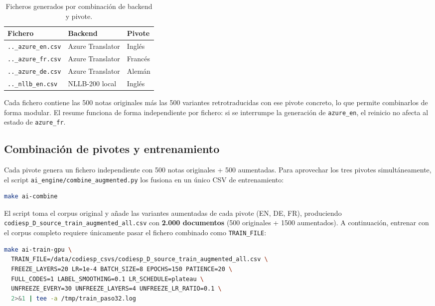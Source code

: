 \begin{table}[h]
\centering
\caption{Ficheros generados por combinación de backend y pivote.}
\label{tab:augment-files}
\begin{tabular}{lll}
\hline
\textbf{Fichero} & \textbf{Backend} & \textbf{Pivote} \\
\hline
\texttt{..\_azure\_en.csv} & Azure Translator & Inglés \\
\texttt{..\_azure\_fr.csv} & Azure Translator & Francés \\
\texttt{..\_azure\_de.csv} & Azure Translator & Alemán \\
\texttt{..\_nllb\_en.csv}  & NLLB-200 local   & Inglés \\
\hline
\end{tabular}
\end{table}

Cada fichero contiene las 500 notas originales más las 500 variantes retrotraducidas con ese pivote concreto, lo que permite combinarlos de forma modular. El resume funciona de forma independiente por fichero: si se interrumpe la generación de \texttt{azure\_en}, el reinicio no afecta al estado de \texttt{azure\_fr}.

\subsection{Combinación de pivotes y entrenamiento}

Cada pivote genera un fichero independiente con 500 notas originales + 500 aumentadas. Para aprovechar los tres pivotes simultáneamente, el script \texttt{ai\_engine/combine\_augmented.py} los fusiona en un único CSV de entrenamiento:

\begin{lstlisting}[language=bash]
make ai-combine
\end{lstlisting}

El script toma el corpus original y añade las variantes aumentadas de cada pivote (EN, DE, FR), produciendo \texttt{codiesp\_D\_source\_train\_augmented\_all.csv} con \textbf{2.000 documentos} (500 originales + 1500 aumentados). A continuación, entrenar con el corpus completo requiere únicamente pasar el fichero combinado como \texttt{TRAIN\_FILE}:

\begin{lstlisting}[language=bash, breaklines=true, breakatwhitespace=false]
make ai-train-gpu \
  TRAIN_FILE=/data/codiesp_csvs/codiesp_D_source_train_augmented_all.csv \
  FREEZE_LAYERS=20 LR=1e-4 BATCH_SIZE=8 EPOCHS=150 PATIENCE=20 \
  FULL_CODES=1 LABEL_SMOOTHING=0.1 LR_SCHEDULE=plateau \
  UNFREEZE_EVERY=30 UNFREEZE_LAYERS=4 UNFREEZE_LR_RATIO=0.1 \
  2>&1 | tee -a /tmp/train_paso32.log
\end{lstlisting}

